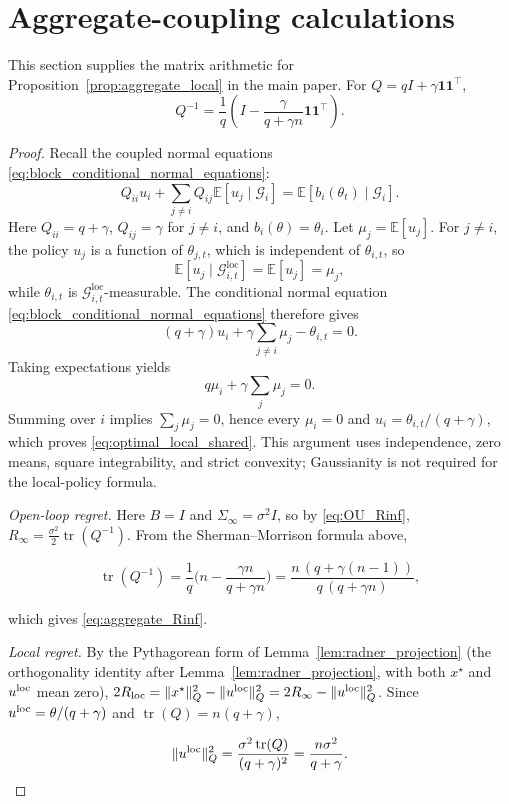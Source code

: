\renewcommand{\thesection}{S\arabic{section}}
\renewcommand{\theequation}{S\arabic{equation}}
\section{Aggregate-coupling calculations}
\label{supp:aggregate}
This section supplies the matrix arithmetic for Proposition~\ref{prop:aggregate_local}
in the main paper. For $Q=qI+\gamma\mathbf1\mathbf1^\top$,
\[
Q^{-1}=\frac1q\left(I-\frac{\gamma}{q+\gamma n}\mathbf1\mathbf1^\top\right).
\]
\begin{proof}
Recall the coupled normal equations \eqref{eq:block_conditional_normal_equations}:
\[
 Q_{ii}u_i+\sum_{j\ne i}Q_{ij}\mathbb E[u_j\mid\mathcal G_i]
 =\mathbb E[b_i(\theta_t)\mid\mathcal G_i].
\]
Here $Q_{ii}=q+\gamma$, $Q_{ij}=\gamma$ for $j\ne i$, and $b_i(\theta)=\theta_i$.
Let $\mu_j=\mathbb E[u_j]$. For $j\ne i$, the policy $u_j$ is a function of $\theta_{j,t}$,
which is independent of $\theta_{i,t}$, so
\[
\mathbb E[u_j\mid\mathcal G^{\mathrm{loc}}_{i,t}]
=\mathbb E[u_j]=\mu_j,
\]
while $\theta_{i,t}$ is
$\mathcal G^{\mathrm{loc}}_{i,t}$-measurable. The conditional normal equation
\eqref{eq:block_conditional_normal_equations} therefore gives
\[
(q+\gamma)u_i
+\gamma\sum_{j\ne i}\mu_j
-\theta_{i,t}=0.
\]
Taking expectations yields
\[
q\mu_i+\gamma\sum_j\mu_j=0.
\]
Summing over $i$ implies $\sum_j\mu_j=0$, hence every $\mu_i=0$ and
$u_i=\theta_{i,t}/(q+\gamma)$, which proves
\eqref{eq:optimal_local_shared}. This argument uses independence, zero means,
square integrability, and strict convexity; Gaussianity is not required for the
local-policy formula.

\emph{Open-loop regret.} Here $B=I$ and $\Sigma_\infty=\sigma^2I$, so by \eqref{eq:OU_Rinf}, $R_\infty=\tfrac{\sigma^2}2\operatorname{tr}(Q^{-1})$. From the Sherman--Morrison formula above,

\[
\operatorname{tr}(Q^{-1})=\frac1q\Big(n-\frac{\gamma n}{q+\gamma n}\Big)=\frac{n\,(q+\gamma(n-1))}{q\,(q+\gamma n)},
\]

which gives \eqref{eq:aggregate_Rinf}.

\emph{Local regret.} By the Pythagorean form of Lemma~\ref{lem:radner_projection} (the orthogonality identity after Lemma~\ref{lem:radner_projection}, with both $x^\star$ and $u^{\rm loc}$ mean zero), $2R_{\rm loc}=\|x^\star\|_Q^2-\|u^{\rm loc}\|_Q^2=2R_\infty-\|u^{\rm loc}\|_Q^2$. Since $u^{\rm loc}=\theta/(q+\gamma)$ and $\operatorname{tr}(Q)=n(q+\gamma)$,

\[
\|u^{\rm loc}\|_Q^2=\frac{\sigma^2\operatorname{tr}(Q)}{(q+\gamma)^2}=\frac{n\sigma^2}{q+\gamma}.
\]


\end{proof}
